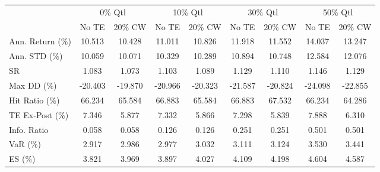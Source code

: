 \begin{tabular}{lcccccccc}
\toprule
{} & \multicolumn{2}{c}{0\% Qtl} & \multicolumn{2}{c}{10\% Qtl} & \multicolumn{2}{c}{30\% Qtl} & \multicolumn{2}{c}{50\% Qtl} \\
{} &   No TE &  20\% CW &   No TE &  20\% CW &   No TE &  20\% CW &   No TE &  20\% CW \\
\midrule
Ann. Return (\%) &  10.513 &  10.428 &  11.011 &  10.826 &  11.918 &  11.552 &  14.037 &  13.247 \\
Ann. STD (\%)    &  10.059 &  10.071 &  10.329 &  10.289 &  10.894 &  10.748 &  12.584 &  12.076 \\
SR              &   1.083 &   1.073 &   1.103 &   1.089 &   1.129 &   1.110 &   1.146 &   1.129 \\
Max DD (\%)      & -20.403 & -19.870 & -20.966 & -20.323 & -21.587 & -20.824 & -24.098 & -22.855 \\
Hit Ratio (\%)   &  66.234 &  65.584 &  66.883 &  65.584 &  66.883 &  67.532 &  66.234 &  64.286 \\
TE Ex-Post (\%)  &   7.346 &   5.877 &   7.332 &   5.866 &   7.298 &   5.839 &   7.888 &   6.310 \\
Info. Ratio     &   0.058 &   0.058 &   0.126 &   0.126 &   0.251 &   0.251 &   0.501 &   0.501 \\
VaR (\%)         &   2.917 &   2.986 &   2.977 &   3.032 &   3.111 &   3.124 &   3.530 &   3.441 \\
ES (\%)          &   3.821 &   3.969 &   3.897 &   4.027 &   4.109 &   4.198 &   4.604 &   4.587 \\
\bottomrule
\end{tabular}
